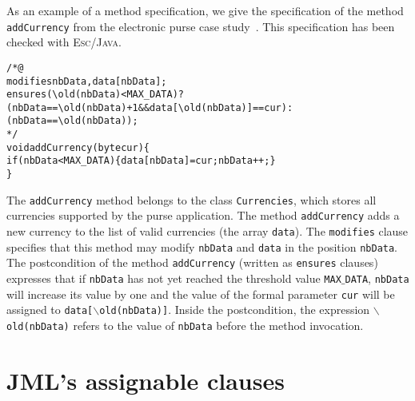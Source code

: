 \documentclass[a4paper]{llncs}
\newcommand{\escj}{\textsc{Esc/Java}}
\begin{document}
As an example of a method specification, we give the
specification of the method \texttt{addCurrency} from the electronic
purse case study~\cite{CatanoH02a}. This specification has been
checked with \escj.
\begin{alltt}
/*@
  modifies nbData, data[nbData];
  ensures (\verb!\!old(nbData) < MAX_DATA) ?
      (nbData == \verb!\!old(nbData) + 1 && data[\verb!\!old(nbData)] == cur) :
      (nbData == \verb!\!old(nbData));
*/
void addCurrency(byte cur)\verb!{!
   if(nbData < MAX_DATA)\verb!{!data[nbData] = cur; nbData++;\verb!}!
\verb!}!
\end{alltt}
The \texttt{addCurrency} method belongs
to the class \texttt{Currencies}, which stores all currencies 
supported by the purse application. The method 
\texttt{addCurrency} adds a new currency to the list of valid 
currencies (the array \texttt{data}). The \texttt{modifies} clause
specifies that this method may modify \texttt{nbData} and 
\texttt{data} in the position \texttt{nbData}. The
postcondition of the method \texttt{addCurrency} (written as 
\texttt{ensures} clauses) expresses that if \texttt{nbData} has not 
yet reached the threshold value \texttt{MAX$\_$DATA}, \texttt{nbData} 
will increase its value by one and the value of the formal parameter 
\texttt{cur} will be assigned to \texttt{data[\(\backslash\)old(nbData)]}.  
Inside the postcondition, the expression 
\texttt{$\backslash$old(nbData)} refers to the value of 
\texttt{nbData} before the method invocation. 



\section{JML's assignable clauses}
\label{sec-ass}
\end{document}
